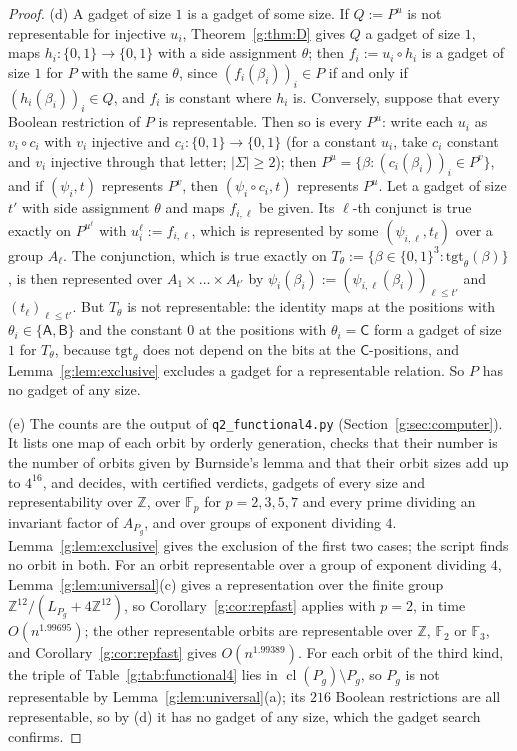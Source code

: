 \documentclass[11pt]{article}
\theoremstyle{definition}
\theoremstyle{remark}
\newcommand{\Z}{\mathbb{Z}}
\newcommand{\F}{\mathbb{F}_2}
\newcommand{\Fp}{\mathbb{F}_p}
\DeclareMathOperator{\cl}{cl}
\newcommand{\ExpBestUp}{1.99389}%
\newcommand{\ExpHalfBestUp}{1.99695}%
\begin{document}
\begin{proof}
(d) A gadget of size $1$ is a gadget of some size. If $Q:=P^u$ is not representable for injective $u_i$, Theorem~\ref{g:thm:D} gives $Q$ a gadget of size $1$, maps $h_i\colon\{0,1\}\to\{0,1\}$ with a side assignment $\theta$; then $f_i:=u_i\circ h_i$ is a gadget of size $1$ for $P$ with the same $\theta$, since $(f_i(\beta_i))_i\in P$ if and only if $(h_i(\beta_i))_i\in Q$, and $f_i$ is constant where $h_i$ is. Conversely, suppose that every Boolean restriction of $P$ is representable. Then so is every $P^u$: write each $u_i$ as $v_i\circ c_i$ with $v_i$ injective and $c_i\colon\{0,1\}\to\{0,1\}$ (for a constant $u_i$, take $c_i$ constant and $v_i$ injective through that letter; $|\Sigma|\ge2$); then $P^u=\{\beta:(c_i(\beta_i))_i\in P^v\}$, and if $(\psi_i,t)$ represents $P^v$, then $(\psi_i\circ c_i,t)$ represents $P^u$. Let a gadget of size $t'$ with side assignment $\theta$ and maps $f_{i,\ell}$ be given. Its $\ell$-th conjunct is true exactly on $P^{u^\ell}$ with $u^\ell_i:=f_{i,\ell}$, which is represented by some $(\psi_{i,\ell},t_\ell)$ over a group $A_\ell$. The conjunction, which is true exactly on $T_\theta:=\{\beta\in\{0,1\}^3:\mathrm{tgt}_\theta(\beta)\}$, is then represented over $A_1\times\dots\times A_{t'}$ by $\psi_i(\beta_i):=(\psi_{i,\ell}(\beta_i))_{\ell\le t'}$ and $(t_\ell)_{\ell\le t'}$. But $T_\theta$ is not representable: the identity maps at the positions with $\theta_i\in\{\mathsf A,\mathsf B\}$ and the constant $0$ at the positions with $\theta_i=\mathsf C$ form a gadget of size $1$ for $T_\theta$, because $\mathrm{tgt}_\theta$ does not depend on the bits at the $\mathsf C$-positions, and Lemma~\ref{g:lem:exclusive} excludes a gadget for a representable relation. So $P$ has no gadget of any size.

(e) The counts are the output of \texttt{q2\_functional4.py} (Section~\ref{g:sec:computer}). It lists one map of each orbit by orderly generation, checks that their number is the number of orbits given by Burnside's lemma and that their orbit sizes add up to $4^{16}$, and decides, with certified verdicts, gadgets of every size and representability over $\Z$, over $\Fp$ for $p=2,3,5,7$ and every prime dividing an invariant factor of $A_{P_g}$, and over groups of exponent dividing $4$. Lemma~\ref{g:lem:exclusive} gives the exclusion of the first two cases; the script finds no orbit in both. For an orbit representable over a group of exponent dividing $4$, Lemma~\ref{g:lem:universal}(c) gives a representation over the finite group $\Z^{12}/(L_{P_g}+4\Z^{12})$, so Corollary~\ref{g:cor:repfast} applies with $p=2$, in time $O(n^{\ExpHalfBestUp})$; the other representable orbits are representable over $\Z$, $\F$ or $\mathbb F_3$, and Corollary~\ref{g:cor:repfast} gives $O(n^{\ExpBestUp})$. For each orbit of the third kind, the triple of Table~\ref{g:tab:functional4} lies in $\cl(P_g)\setminus P_g$, so $P_g$ is not representable by Lemma~\ref{g:lem:universal}(a); its $216$ Boolean restrictions are all representable, so by (d) it has no gadget of any size, which the gadget search confirms.


\end{proof}
\end{document}
